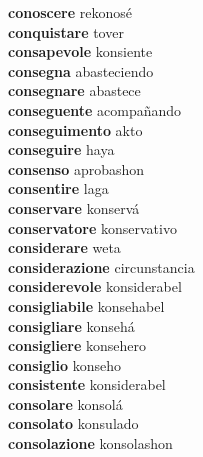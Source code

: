 \textbf{conoscere } rekonosé \\
\textbf{conquistare } tover \\
\textbf{consapevole } konsiente \\
\textbf{consegna } abasteciendo \\
\textbf{consegnare } abastece \\
\textbf{conseguente } acompañando \\
\textbf{conseguimento } akto \\
\textbf{conseguire } haya \\
\textbf{consenso } aprobashon \\
\textbf{consentire } laga \\
\textbf{conservare } konservá \\
\textbf{conservatore } konservativo \\
\textbf{considerare } weta \\
\textbf{considerazione } circunstancia \\
\textbf{considerevole } konsiderabel \\
\textbf{consigliabile } konsehabel \\
\textbf{consigliare } konsehá \\
\textbf{consigliere } konsehero \\
\textbf{consiglio } konseho \\
\textbf{consistente } konsiderabel \\
\textbf{consolare } konsolá \\
\textbf{consolato } konsulado \\
\textbf{consolazione } konsolashon \\
